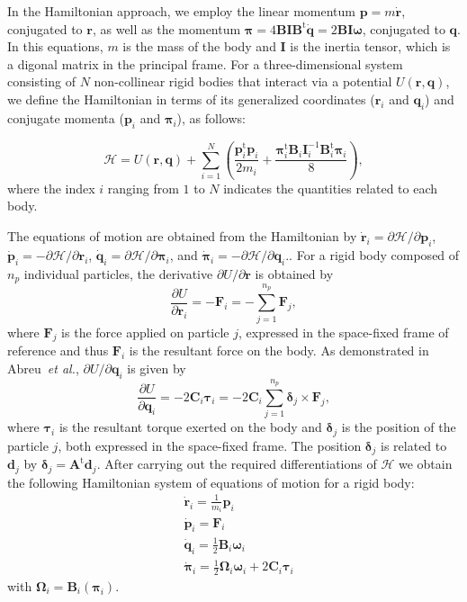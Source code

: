 \documentclass[aip,jcp,reprint,amsmath,amssymb]{revtex4-1}
\newcommand{\mt}[1]{\boldsymbol{\mathbf{#1}}}           %
\newcommand{\vt}[1]{\boldsymbol{\mathbf{#1}}}           %
\newcommand{\tr}[1]{#1^\text{t}}                        %
\newcommand{\diff}[2]{\dfrac{\partial #1}{\partial #2}} %
\begin{document}
In the Hamiltonian approach, we employ the linear momentum $\vt p = m \dot{\vt r}$, conjugated to $\vt r$, as well as the momentum $\vt \pi= 4 \mt B \mt I \tr{\mt B} \dot{\vt q} = 2 \mt B \mt I \vt \omega$, conjugated to $\vt q$\cite{Goldstein2002}. In this equations, $m$ is the mass of the body and $\mt I$ is the inertia tensor, which is a digonal matrix in the principal frame. For a three-dimensional system consisting of $N$ non-collinear rigid bodies that interact via a potential $U(\vt r, \vt q)$, we define the Hamiltonian in terms of its generalized coordinates ($\vt r_i$ and $\vt q_i$) and conjugate momenta ($\vt p_i$ and $\vt \pi_i$), as follows:~\cite{Abreu_2017}

\begin{equation}
\label{eq:H_NVE}
\mathcal{H} = U(\vt r,\vt q) + \sum_{i=1}^N \left(\frac{\tr{\vt p}_i{\vt p}_i}{2m_i} + \frac{\tr{\vt \pi}_i {\mt B}_i {\mt I}_i^{-1} \tr{\mt B}_i {\vt \pi}_i}{8}\right),
\end{equation}
where the index $i$ ranging from $1$ to $N$ indicates the quantities related to each body.

The equations of motion are obtained from the Hamiltonian by $\dot{\vt r}_i = \partial \mathcal{H} / \partial \vt p_i$, $\dot{\vt p}_i = -\partial \mathcal{H} / \partial \vt r_i$, $\dot{\vt q}_i = \partial \mathcal{H} / \partial \vt \pi_i$, and $\dot{\vt \pi}_i = -\partial \mathcal{H} / \partial \vt q_i$.\cite{Goldstein2002}. For a rigid body composed of $n_p$ individual particles, the derivative $\partial U/\partial \vt r$ is obtained by
\[
\diff{U}{\vt r_i} = -\vt F_i = -\sum_{j=1}^{n_p} {\vt F_j},
\]
where $\vt F_j$ is the force applied on particle $j$, expressed in the space-fixed frame of reference and thus $\vt F_i$ is the resultant force on the body. As demonstrated in Abreu~\textit{et al.},\citep{Abreu_2017} $\partial{U}/\partial \vt q_i$ is given by
\[
\diff{U}{\vt q_i} = -2 \mt C_i \vt \tau_i = -2 \mt C_i \sum_{j=1}^{n_p} {\vt \delta_j} \times {\vt F_j},
\]
where $\vt \tau_i$ is the resultant torque exerted on the body and ${\vt \delta}_j$ is the position of the particle $j$, both expressed in the space-fixed frame.  The position ${\vt \delta}_j$ is related to ${\vt d}_j$ by ${\vt \delta}_j = \tr{\mt A} {\vt d}_j$.\cite{Goldstein2002} After carrying out the required differentiations of $\mathcal{H}$  we obtain the following Hamiltonian system of equations of motion for a rigid body:
\begin{subequations}
\label{eq:EDO_system}
\begin{align}
&\dot{\vt r}_i = \frac{1}{m_i} \vt p_i \\
&\dot{\vt p}_i = \mt F_i \\
&\dot{\vt q}_i = \frac{1}{2} \mt B_i \vt \omega_i \label{eq:EDO_q} \\
&\dot{\vt \pi}_i = \frac{1}{2} \mt \Omega_i \vt \omega_i + 2 \mt C_i \vt \tau_i \label{eq:EDO_pi}
\end{align}
\end{subequations}
with $\mt \Omega_i = \mt B_i(\vt \pi_i)$.
\end{document}
